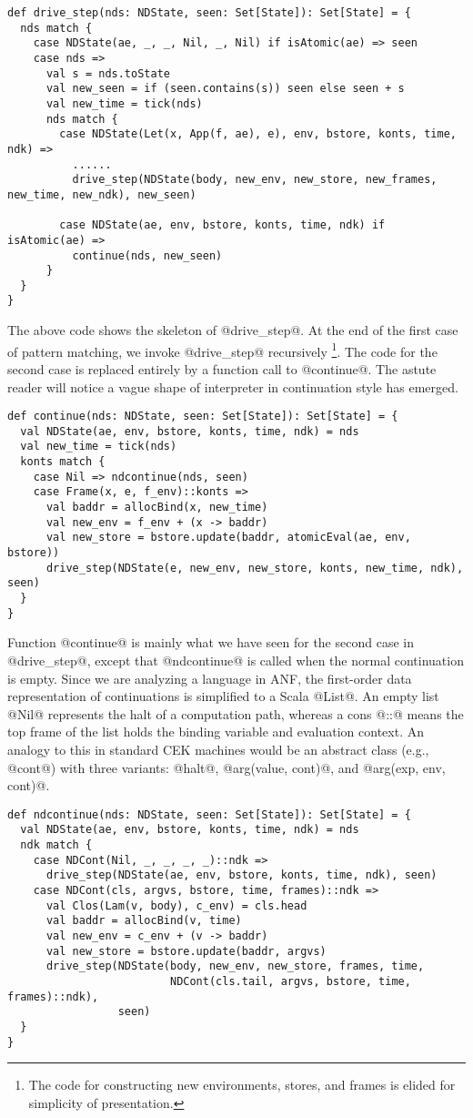 \documentclass[acmsmall]{acmart}\settopmatter{}
\begin{document}
\begin{lstlisting}
def drive_step(nds: NDState, seen: Set[State]): Set[State] = {
  nds match {
    case NDState(ae, _, _, Nil, _, Nil) if isAtomic(ae) => seen
    case nds =>
      val s = nds.toState
      val new_seen = if (seen.contains(s)) seen else seen + s
      val new_time = tick(nds)
      nds match {
        case NDState(Let(x, App(f, ae), e), env, bstore, konts, time, ndk) =>
          ......
          drive_step(NDState(body, new_env, new_store, new_frames, new_time, new_ndk), new_seen)

        case NDState(ae, env, bstore, konts, time, ndk) if isAtomic(ae) =>
          continue(nds, new_seen)
      }
  }
}
\end{lstlisting}

The above code shows the skeleton of @drive_step@.
At the end of the first case of pattern matching, we invoke @drive_step@ recursively 
\footnote{The code for constructing new environments, stores, and frames is elided for 
simplicity of presentation.}.
The code for the second case is replaced entirely by a function call to @continue@.
The astute reader will notice a vague shape of interpreter in continuation style has emerged.

\begin{lstlisting}
def continue(nds: NDState, seen: Set[State]): Set[State] = {
  val NDState(ae, env, bstore, konts, time, ndk) = nds
  val new_time = tick(nds)
  konts match {
    case Nil => ndcontinue(nds, seen)
    case Frame(x, e, f_env)::konts =>
      val baddr = allocBind(x, new_time)
      val new_env = f_env + (x -> baddr)
      val new_store = bstore.update(baddr, atomicEval(ae, env, bstore))
      drive_step(NDState(e, new_env, new_store, konts, new_time, ndk), seen)
  }
}
\end{lstlisting}

Function @continue@ is mainly what we have seen for the second case in
@drive_step@, except that @ndcontinue@ is called when
the normal continuation is empty.
Since we are analyzing a language in ANF, the first-order data representation of
continuations is simplified to a Scala @List@.
An empty list @Nil@ represents the halt of a computation path, whereas
a cons @::@ means the top frame of the list holds the binding variable and
evaluation context.
An analogy to this in standard CEK machines would be an abstract class (e.g., @cont@) with
three variants: @halt@, @arg(value, cont)@, and @arg(exp, env, cont)@.

\begin{lstlisting}
def ndcontinue(nds: NDState, seen: Set[State]): Set[State] = {
  val NDState(ae, env, bstore, konts, time, ndk) = nds
  ndk match {
    case NDCont(Nil, _, _, _, _)::ndk =>
      drive_step(NDState(ae, env, bstore, konts, time, ndk), seen)
    case NDCont(cls, argvs, bstore, time, frames)::ndk =>
      val Clos(Lam(v, body), c_env) = cls.head
      val baddr = allocBind(v, time)
      val new_env = c_env + (v -> baddr)
      val new_store = bstore.update(baddr, argvs)
      drive_step(NDState(body, new_env, new_store, frames, time,
                         NDCont(cls.tail, argvs, bstore, time, frames)::ndk),
                 seen)
  }
}
\end{lstlisting}
\end{document}
